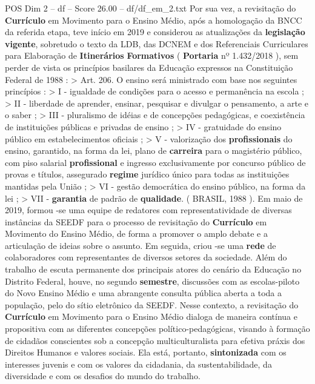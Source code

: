 \begin{textsample}{POS Dim 2 – df – Score 26.00 – df/df\_em\_2.txt}
Por sua vez, a revisitação do \textbf{Currículo} em Movimento para o Ensino Médio, após a homologação da BNCC da referida etapa, teve início em 2019 e considerou as atualizações da \textbf{legislação} \textbf{vigente}, sobretudo o texto da LDB, das DCNEM e dos Referenciais Curriculares para Elaboração de \textbf{Itinerários} \textbf{Formativos} ( \textbf{Portaria} nº 1.432/2018 ), sem perder de vista os princípios basilares da Educação expressos na Constituição Federal de 1988 : > Art. 206.
O ensino será ministrado com base nos seguintes princípios : > I - igualdade de condições para o acesso e permanência na escola ; > II - liberdade de aprender, ensinar, pesquisar e divulgar o pensamento, a arte e o saber ; > III - pluralismo de idéias e de concepções pedagógicas, e coexistência de instituições públicas e privadas de ensino ; > IV - gratuidade do ensino público em estabelecimentos oficiais ; > V - valorização dos \textbf{profissionais} do ensino, garantido, na forma da lei, plano de \textbf{carreira} para o magistério público, com piso salarial \textbf{profissional} e ingresso exclusivamente por concurso público de provas e títulos, assegurado \textbf{regime} jurídico único para todas as instituições mantidas pela União ; > VI - gestão democrática do ensino público, na forma da lei ; > VII - \textbf{garantia} de padrão de \textbf{qualidade}. ( BRASIL, 1988 ).
Em maio de 2019, formou -se uma equipe de redatores com representatividade de diversas instâncias da SEEDF para o processo de revisitação do \textbf{Currículo} em Movimento do Ensino Médio, de forma a promover o amplo debate e a articulação de ideias sobre o assunto.
Em seguida, criou -se uma \textbf{rede} de colaboradores com representantes de diversos setores da sociedade.
Além do trabalho de escuta permanente dos principais atores do cenário da Educação no Distrito Federal, houve, no segundo \textbf{semestre}, discussões com as escolas-piloto do Novo Ensino Médio e uma abrangente consulta pública aberta a toda a população, pelo do sítio eletrônico da SEEDF.
Nesse contexto, a revisitação do \textbf{Currículo} em Movimento para o Ensino Médio dialoga de maneira contínua e propositiva com as diferentes concepções político-pedagógicas, visando à formação de cidadãos conscientes sob a concepção multiculturalista para efetiva práxis dos Direitos Humanos e valores sociais.
Ela está, portanto, \textbf{sintonizada} com os interesses juvenis e com os valores da cidadania, da sustentabilidade, da diversidade e com os desafios do mundo do trabalho.

\end{textsample}
